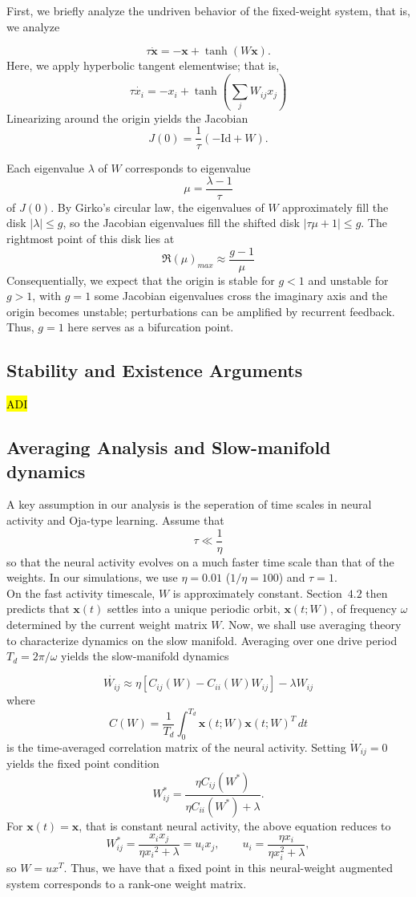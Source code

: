 \documentclass[paper=a4, fontsize=11pt]{scrartcl} %
\numberwithin{equation}{section} %
\numberwithin{figure}{section} %
\numberwithin{table}{section} %
\begin{document}
First, we briefly analyze the undriven behavior of the fixed-weight system, that is, we analyze

\[
\tau \dot{\mathbf{x}}  = -\mathbf{x} +  \tanh(W {\mathbf x}).
\]
Here, we apply hyperbolic tangent elementwise; that is,
\[\tau \dot{x_i} = -x_i + \tanh(\sum_{j}W_{ij}x_j)\]
Linearizing around the origin yields the Jacobian
\[
J(0) = \frac{1}{\tau}(- \text{Id} + W). 
\]

Each eigenvalue $\lambda$ of $W$ corresponds to eigenvalue 
\[
\mu = \frac{\lambda - 1}{\tau}
\]
of $J(0)$. By Girko's circular law, the eigenvalues of $W$ approximately fill the disk
$|\lambda| \leq g$, so the Jacobian eigenvalues fill the shifted disk
$|\tau\mu + 1| \leq g$.  The rightmost point of this disk lies at
\[
\Re(\mu)_{max} \approx \frac{g-1}{\mu}
\]
Consequentially, we expect that the origin is stable for $g < 1$ and unstable for $ g > 1$, with $g=1$ some Jacobian eigenvalues cross the imaginary axis and the origin becomes unstable; perturbations
can be amplified by recurrent feedback. Thus, $g=1$ here serves as a bifurcation point. 

\subsection{Stability and Existence Arguments}
\hl{ ADI} 
\subsection{Averaging Analysis and Slow-manifold dynamics}
A key assumption in our analysis is the seperation of time scales in neural activity and Oja-type learning. Assume that
\[\tau \ll \frac{1}{\eta}\]
so that the neural activity evolves on a much faster time scale than that of the weights. In our simulations, we use $\eta = 0.01$ ($1/\eta = 100$) and $\tau = 1$. \\

On the fast activity timescale, $W$ is approximately constant. Section~$4.2$ then predicts that $\mathbf{x}(t)$ settles into a unique periodic orbit, $\mathbf{x}(t; W)$, of frequency $\omega$ determined by the current weight matrix $W$. Now, we shall use averaging theory to characterize dynamics on the slow manifold. Averaging over one drive period $T_d = 2 \pi / \omega$ yields the slow-manifold dynamics

\[
\dot{W_{ij}} \approx \eta[C_{ij}(W) - C_{ii}(W)W_{ij}] - \lambda W_{ij}
\]
where
\[
C(W) = \frac{1}{T_{d}} \int_{0}^{T_d}\mathbf{x}(t; W)\mathbf{x}(t;W)^T \, dt
\]
is the time-averaged correlation matrix of the neural activity. Setting $\dot{W}_{ij} = 0$ yields the fixed point condition
\[
W_{ij}^* = \frac{\eta C_{ij}(W^*)}{\eta C_{ii}(W^*) + \lambda}. 
\]
For $\mathbf{x}(t) = \mathbf{x}$, that is constant neural activity, the above equation reduces to 
\[
W_{ij}^* = \frac{x_ix_j}{\eta{x_i}^2 + \lambda} = u_ix_j, \qquad u_i = \frac{\eta x_i}{\eta x_i^2 + \lambda},
\]
so
$W = ux^T.$
Thus, we have that a fixed point in this neural-weight augmented system corresponds to a rank-one weight matrix. \\
\end{document}
